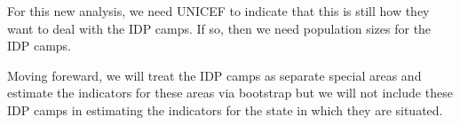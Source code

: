 \documentclass[12pt,a4paper]{article}
\begin{document}
For this new analysis, we need UNICEF to indicate that this is still how they want to deal with the IDP camps. If so, then we need population sizes for the IDP camps.

Moving foreward, we will treat the IDP camps as separate special areas and estimate the indicators for these areas via bootstrap but we will not include these IDP camps in estimating the indicators for the state in which they are situated.
\end{document}
